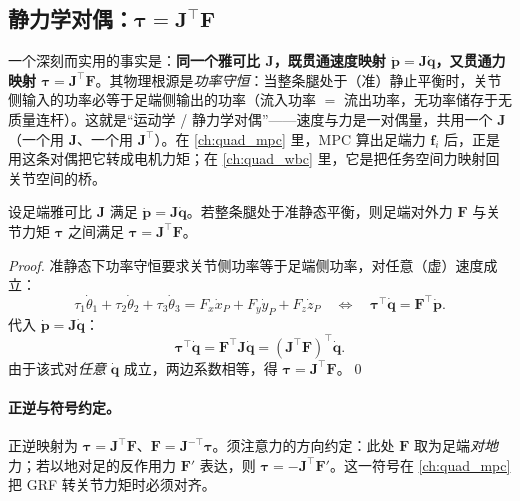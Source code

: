 \subsection{静力学对偶：\texorpdfstring{$\boldsymbol{\tau}=\mathbf{J}^\top\mathbf{F}$}{tau=J^TF}}
\label{subsec:qk-statics}

\begin{insight}\label{ins:qk-duality}
一个深刻而实用的事实是：\textbf{同一个雅可比 $\mathbf{J}$，既贯通速度映射 $\dot{\boldsymbol{p}}=\mathbf{J}\dot{\boldsymbol{q}}$，又贯通力映射 $\boldsymbol{\tau}=\mathbf{J}^\top\mathbf{F}$}。其物理根源是\emph{功率守恒}：当整条腿处于（准）静止平衡时，关节侧输入的功率必等于足端侧输出的功率（流入功率 $=$ 流出功率，无功率储存于无质量连杆）\cite{unitree2023quadruped}。这就是“运动学 / 静力学对偶”——速度与力是一对偶量，共用一个 $\mathbf{J}$（一个用 $\mathbf{J}$、一个用 $\mathbf{J}^\top$）。在 \cref{ch:quad_mpc} 里，MPC 算出足端力 $\mathbf{f}_i$ 后，正是用这条对偶把它转成电机力矩；在 \cref{ch:quad_wbc} 里，它是把任务空间力映射回关节空间的桥。
\end{insight}

\begin{theorem}\label{thm:qk-duality}
设足端雅可比 $\mathbf{J}$ 满足 $\dot{\boldsymbol{p}}=\mathbf{J}\dot{\boldsymbol{q}}$。若整条腿处于准静态平衡，则足端对外力 $\mathbf{F}$ 与关节力矩 $\boldsymbol{\tau}$ 之间满足 $\boldsymbol{\tau}=\mathbf{J}^\top\mathbf{F}$。
\end{theorem}
\begin{proof}
准静态下功率守恒要求关节侧功率等于足端侧功率，对任意（虚）速度成立\cite{unitree2023quadruped}：
\begin{equation}
  \tau_1\dot\theta_1+\tau_2\dot\theta_2+\tau_3\dot\theta_3
  =F_x\dot x_P+F_y\dot y_P+F_z\dot z_P
  \quad\Longleftrightarrow\quad
  \boldsymbol{\tau}^\top\dot{\boldsymbol{q}}=\mathbf{F}^\top\dot{\boldsymbol{p}}.
  \label{eq:qk-power-balance}
\end{equation}
代入 $\dot{\boldsymbol{p}}=\mathbf{J}\dot{\boldsymbol{q}}$：
\[
  \boldsymbol{\tau}^\top\dot{\boldsymbol{q}}=\mathbf{F}^\top\mathbf{J}\dot{\boldsymbol{q}}
  =(\mathbf{J}^\top\mathbf{F})^\top\dot{\boldsymbol{q}}.
\]
由于该式对\emph{任意} $\dot{\boldsymbol{q}}$ 成立，两边系数相等，得 $\boldsymbol{\tau}=\mathbf{J}^\top\mathbf{F}$。\qed
\end{proof}

\paragraph{正逆与符号约定。}
正逆映射为 $\boldsymbol{\tau}=\mathbf{J}^\top\mathbf{F}$、$\mathbf{F}=\mathbf{J}^{-\top}\boldsymbol{\tau}$。须注意力的方向约定：此处 $\mathbf{F}$ 取为足端\emph{对地}力；若以地对足的反作用力 $\mathbf{F}'$ 表达，则 $\boldsymbol{\tau}=-\mathbf{J}^\top\mathbf{F}'$\cite{unitree2023quadruped}。这一符号在 \cref{ch:quad_mpc} 把 GRF 转关节力矩时必须对齐。

